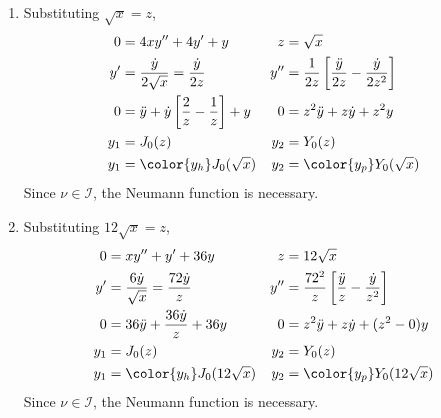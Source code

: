 \begin{enumerate}
    \item Substituting $ \sqrt{x} = z $,
          \begin{align}
              0           & = 4xy'' + 4y' + y                                     &
              z           & = \sqrt{x}                                              \\
              y'          & = \frac{\dot{y}}{2\sqrt{x}} = \frac{\dot{y}}{2z}      &
              y''         & = \frac{1}{2z} \left[ \frac{\ddot{y}}{2z}
              - \frac{\dot{y}}{2z^2} \right]                                        \\
              0           & = \ddot{y} + \dot{y} \left[ \frac{2}{z} - \frac{1}{z}
              \right] + y &
              0           & = z^2 \ddot{y} + z\dot{y} + z^2y                        \\
              y_1         & = J_0(z)                                              &
              y_2         & = Y_0(z)                                                \\
              y_1         & = \color{y_h}J_0(\sqrt{x})                            &
              y_2         & = \color{y_p}Y_0(\sqrt{x})
          \end{align}
          Since $ \nu \in \mathcal{I} $, the Neumann function is necessary.

    \item Substituting $ 12\sqrt{x} = z $,
          \begin{align}
              0   & = xy'' + y' + 36y                                 &
              z   & = 12\sqrt{x}                                        \\
              y'  & = \frac{6\dot{y}}{\sqrt{x}} = \frac{72\dot{y}}{z} &
              y'' & = \frac{72^2}{z} \left[ \frac{\ddot{y}}{z}
              - \frac{\dot{y}}{z^2} \right]                             \\
              0   & = 36 \ddot{y} + \frac{36\dot{y}}{z} + 36y         &
              0   & = z^2 \ddot{y} + z\dot{y} + (z^2 - 0)y              \\
              y_1 & = J_0(z)                                          &
              y_2 & = Y_0(z)                                            \\
              y_1 & = \color{y_h}J_0(12\sqrt{x})                      &
              y_2 & = \color{y_p}Y_0(12\sqrt{x})
          \end{align}
          Since $ \nu \in \mathcal{I} $, the Neumann function is necessary.


\end{enumerate}
